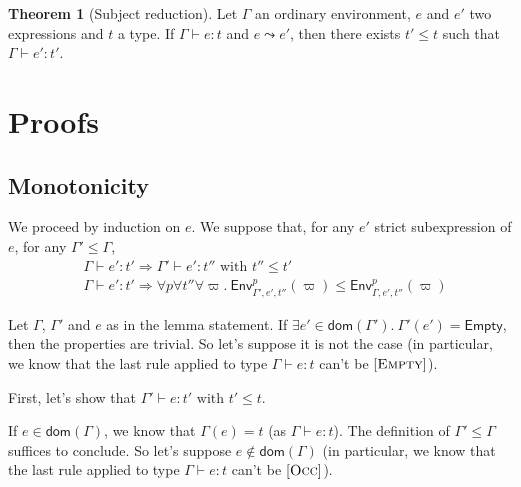 \documentclass[a4paper]{article}%
\newcommand{\dom}[1]{\textsf{dom}(#1)}
\newcommand{\Empty} {\textsf{Empty}}%
\newcommand{\Gp}[2]{\textsf{Env}^{#1}_{#2}}
\theoremstyle{definition}
\newtheorem{theorem}{Theorem}
\newcommand {\Rule}[1] {[\textsc{#1}]}
\begin{document}
    \begin{theorem}[Subject reduction]
      Let $\Gamma$ an ordinary environment, $e$ and $e'$ two expressions and $t$ a type.
      If $\Gamma \vdash e : t$ and $e \leadsto e'$, then there exists $t' \leq t$ such that $\Gamma \vdash e' : t'$.
    \end{theorem}

    \section{Proofs}

    \subsection{Monotonicity}

    We proceed by induction on $e$. We suppose that, for any $e'$ strict subexpression of $e$, for any $\Gamma' \leq \Gamma$,
    \begin{align*}
      &\Gamma \vdash e':t' \Rightarrow \Gamma' \vdash e':t'' \text{ with } t'' \leq t'\\
      &\Gamma \vdash e':t' \Rightarrow \forall p \forall t'' \forall \varpi.\ \Gp p {\Gamma',e',t''} (\varpi) \leq \Gp p {\Gamma,e',t''} (\varpi)
    \end{align*}

    Let $\Gamma$, $\Gamma'$ and $e$ as in the lemma statement.
    If $\exists e' \in \dom {\Gamma'}.\ \Gamma'(e') = \Empty$, then the properties are trivial.
    So let's suppose it is not the case (in particular, we know that the last rule applied to type $\Gamma \vdash e:t$ can't be $\Rule{Empty}$).

    First, let's show that $\Gamma' \vdash e:t' \text{ with } t' \leq t$.

    If $e\in\dom\Gamma$, we know that $\Gamma(e)=t$ (as $\Gamma \vdash e:t$). The definition of $\Gamma' \leq \Gamma$ suffices to conclude.
    So let's suppose $e\not\in\dom\Gamma$ (in particular, we know that the last rule applied to type $\Gamma \vdash e:t$ can't be $\Rule{Occ}$).
\end{document}
